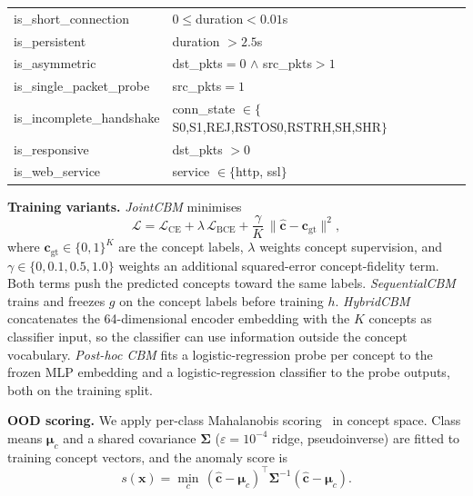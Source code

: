 \documentclass[journal]{IEEEtran}
\begin{document}
\begin{table}[t]
{\begin{tabular}{@{}ll@{}}
is\_short\_connection    & $0{\le}$duration${<}0.01$s \\
is\_persistent           & duration ${>}2.5$s \\
is\_asymmetric           & dst\_pkts${=}0$ $\wedge$ src\_pkts${>}1$ \\
is\_single\_packet\_probe & src\_pkts${=}1$ \\
is\_incomplete\_handshake & conn\_state $\in\{$S0,S1,REJ,RSTOS0,RSTRH,SH,SHR$\}$ \\
is\_responsive           & dst\_pkts ${>}0$ \\
is\_web\_service         & service $\in\{$http, ssl$\}$ \\
\bottomrule
\end{tabular}}
\end{table}

\textbf{Training variants.} \emph{JointCBM} minimises
\begin{equation}
  \mathcal{L} = \mathcal{L}_{\mathrm{CE}} + \lambda\,\mathcal{L}_{\mathrm{BCE}}
    + \frac{\gamma}{K}\,\|\hat{\mathbf{c}} - \mathbf{c}_{\text{gt}}\|^2,
\end{equation}
where $\mathbf{c}_{\text{gt}}\in\{0,1\}^K$ are the concept labels, $\lambda$ weights concept supervision, and $\gamma\in\{0,0.1,0.5,1.0\}$ weights an additional squared-error concept-fidelity term. Both terms push the predicted concepts toward the same labels. \emph{SequentialCBM} trains and freezes $g$ on the concept labels before training $h$. \emph{HybridCBM} concatenates the 64-dimensional encoder embedding with the $K$ concepts as classifier input, so the classifier can use information outside the concept vocabulary. \emph{Post-hoc CBM} fits a logistic-regression probe per concept to the frozen MLP embedding and a logistic-regression classifier to the probe outputs, both on the training split.

\textbf{OOD scoring.} We apply per-class Mahalanobis scoring~\cite{lee2018simple} in concept space. Class means $\boldsymbol{\mu}_c$ and a shared covariance $\boldsymbol{\Sigma}$ ($\varepsilon{=}10^{-4}$ ridge, pseudoinverse) are fitted to training concept vectors, and the anomaly score is
\begin{equation}
  s(\mathbf{x}) = \min_c\,(\hat{\mathbf{c}}-\boldsymbol{\mu}_c)^\top
  \boldsymbol{\Sigma}^{-1}(\hat{\mathbf{c}}-\boldsymbol{\mu}_c).
  \label{eq:mahal}
\end{equation}
\end{document}
